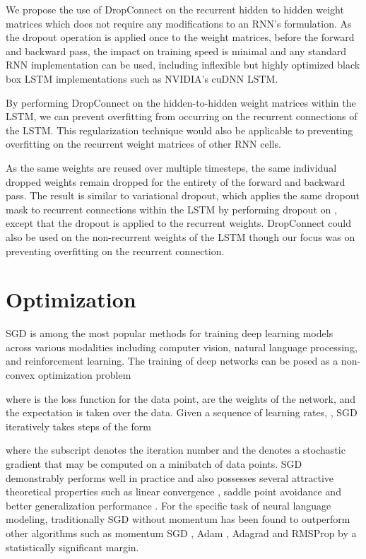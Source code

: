 \documentclass{article}
\begin{document}
We propose the use of DropConnect \citep{dropconnect} on the recurrent hidden to hidden weight matrices which does not require any modifications to an RNN's formulation.
As the dropout operation is applied once to the weight matrices, before the forward and backward pass, the impact on training speed is minimal and any standard RNN implementation can be used, including inflexible but highly optimized black box LSTM implementations such as NVIDIA's cuDNN LSTM.

By performing DropConnect on the hidden-to-hidden weight matrices  within the LSTM, we can prevent overfitting from occurring on the recurrent connections of the LSTM.
This regularization technique would also be applicable to preventing overfitting on the recurrent weight matrices of other RNN cells.

As the same weights are reused over multiple timesteps, the same individual dropped weights remain dropped for the entirety of the forward and backward pass.
The result is similar to variational dropout, which applies the same dropout mask to recurrent connections within the LSTM by performing dropout on , except that the dropout is applied to the recurrent weights.
DropConnect could also be used on the non-recurrent weights of the LSTM  though our focus was on preventing overfitting on the recurrent connection.

\section{Optimization}
SGD is among the most popular methods for training deep learning models across various modalities including computer vision, natural language processing, and reinforcement learning. The training of deep networks can be posed as a non-convex optimization problem

where  is the loss function for the  data point,  are the weights of the network, and the expectation is taken over the data. Given a sequence of learning rates, , SGD iteratively takes steps of the form 

where the subscript denotes the iteration number and the  denotes a stochastic gradient that may be computed on a minibatch of data points. SGD demonstrably performs well in practice and also possesses several attractive theoretical properties such as linear convergence \cite{bottou2016optimization}, saddle point avoidance \cite{panageas2016gradient} and better generalization performance \cite{hardt2015train}.
For the specific task of neural language modeling, traditionally SGD without momentum has been found to outperform other algorithms such as momentum SGD \cite{sutskever2013importance}, Adam \cite{kingma2014adam}, Adagrad \cite{duchi2011adaptive} and RMSProp \cite{tieleman2012lecture} by a statistically significant margin.
\end{document}

